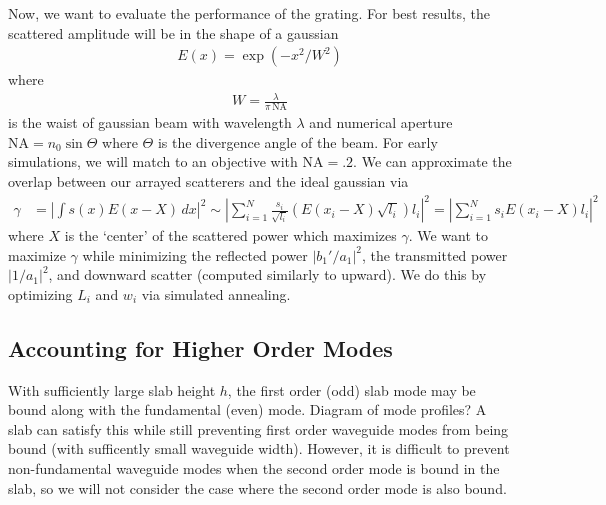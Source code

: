 \documentclass[10pt, letter, oneside,graphicx]{article}
\begin{document}
Now, we want to evaluate the performance of the grating. For best results, the scattered amplitude will be in the shape of a gaussian
\begin{align*}
E(x) = \exp(-x^2/W^2)
\end{align*}
where
\begin{align*}
W = \frac{\lambda}{\pi \, \text{NA}}
\end{align*}
is the waist of gaussian beam with wavelength $\lambda$ and numerical aperture $\text{NA} = n_0\sin\Theta$ where $\Theta$ is the divergence angle of the beam. For early simulations, we will match to an objective with $\text{NA} = .2$.
We can approximate the overlap between our arrayed scatterers and the ideal gaussian via
\begin{align*}
\gamma
&= \left| \int s(x)E(x-X)\,dx\right|^2
\sim \left| \sum_{i=1}^N \frac{s_i}{\sqrt{l_i}}\left(E(x_i-X)\sqrt{l_i}\right)l_i \right|^2
= \left| \sum_{i=1}^N s_iE(x_i-X){l_i} \right|^2
\end{align*}
where $X$ is the `center' of the scattered power which maximizes $\gamma$.
We want to maximize $\gamma$ while minimizing the reflected power $|b_1'/a_1|^2$, the transmitted power $|1/a_1|^2$, and downward scatter (computed similarly to upward). We do this by optimizing $L_i$ and $w_i$ via simulated annealing.


\subsection{Accounting for Higher Order Modes}
With sufficiently large slab height $h$, the first order (odd) slab mode may be bound along with the fundamental (even) mode. Diagram of mode profiles? A slab can satisfy this while still preventing first order waveguide modes from being bound (with sufficently small waveguide width). However, it is difficult to prevent non-fundamental waveguide modes when the second order mode is bound in the slab, so we will not consider the case where the second order mode is also bound.
\end{document}
